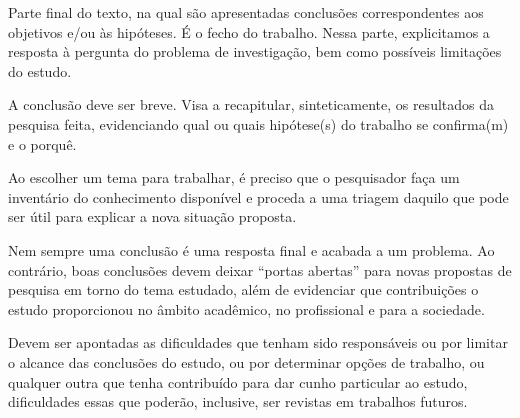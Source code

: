 Parte final do texto, na qual são apresentadas conclusões correspondentes aos objetivos e/ou às hipóteses. É o fecho do trabalho. Nessa parte, explicitamos a resposta à pergunta do problema de investigação, bem como possíveis limitações do estudo.

A conclusão deve ser breve. Visa a recapitular, sinteticamente, os resultados da pesquisa feita, evidenciando qual ou quais hipótese(s) do trabalho se confirma(m) e o porquê.

Ao escolher um tema para trabalhar, é preciso que o pesquisador faça um
inventário do conhecimento disponível e proceda a uma triagem daquilo que pode ser útil para explicar a nova situação proposta.

Nem sempre uma conclusão é uma resposta final e acabada a um problema.
Ao contrário, boas conclusões devem deixar “portas abertas” para novas propostas de pesquisa em torno do tema estudado, além de evidenciar que contribuições o estudo proporcionou no âmbito acadêmico, no profissional e para a sociedade.

Devem ser apontadas as dificuldades que tenham sido responsáveis ou por limitar o alcance das conclusões do estudo, ou por determinar opções de trabalho, ou qualquer outra que tenha contribuído para dar cunho particular ao estudo, dificuldades essas que poderão, inclusive, ser revistas em trabalhos futuros.
